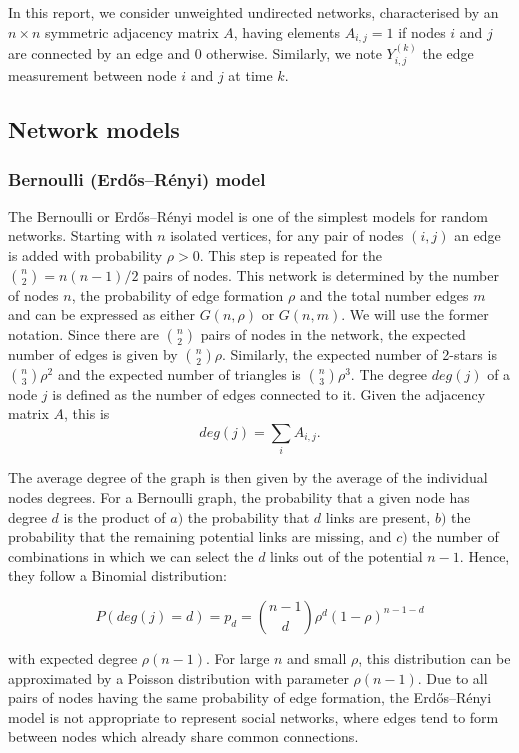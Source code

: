 \documentclass[]{article}
\begin{document}
In this report, we consider unweighted undirected networks,
characterised by an \(n \times n\) symmetric adjacency matrix \(A\),
having elements \(A_{i,j} = 1\) if nodes \(i\) and \(j\) are connected
by an edge and \(0\) otherwise. Similarly, we note \(Y_{i,j}^{(k)}\) the
edge measurement between node \(i\) and \(j\) at time \(k\).

\hypertarget{network-models}{%
\subsection{Network models}\label{network-models}}

\hypertarget{bernoulli-erdosrenyi-model}{%
\subsubsection{Bernoulli (Erdős--Rényi)
model}\label{bernoulli-erdosrenyi-model}}

The Bernoulli or Erdős--Rényi model is one of the simplest models for
random networks. Starting with \(n\) isolated vertices, for any pair of
nodes \((i, j)\) an edge is added with probability \(\rho>0\). This step
is repeated for the \(\binom{n}{2}=n(n-1)/2\) pairs of nodes. This
network is determined by the number of nodes \(n\), the probability of
edge formation \(\rho\) and the total number edges \(m\) and can be
expressed as either \(G(n,\rho)\) or \(G(n,m)\). We will use the former
notation. Since there are \(\binom{n}{2}\) pairs of nodes in the
network, the expected number of edges is given by \(\binom{n}{2}\rho\).
Similarly, the expected number of 2-stars is \(\binom{n}{3}\rho^2\) and
the expected number of triangles is \(\binom{n}{3}\rho^3\). The degree
\(deg(j)\) of a node \(j\) is defined as the number of edges connected
to it. Given the adjacency matrix \(A\), this is
\[ deg(j)=\sum_{i}{A_{i,j}}.\]

The average degree of the graph is then given by the average of the
individual nodes degrees. For a Bernoulli graph, the probability that a
given node has degree \(d\) is the product of \(a)\) the probability
that \(d\) links are present, \(b)\) the probability that the remaining
potential links are missing, and \(c)\) the number of combinations in
which we can select the \(d\) links out of the potential \(n-1\). Hence,
they follow a Binomial distribution:

\[ P(deg(j)=d)=p_d=\binom{n-1}{d}\rho^d(1-\rho)^{n-1-d} \]

with expected degree \(\rho(n-1)\). For large \(n\) and small \(\rho\),
this distribution can be approximated by a Poisson distribution with
parameter \(\rho(n-1)\). Due to all pairs of nodes having the same
probability of edge formation, the Erdős--Rényi model is not appropriate
to represent social networks, where edges tend to form between nodes
which already share common connections.\\
\end{document}
